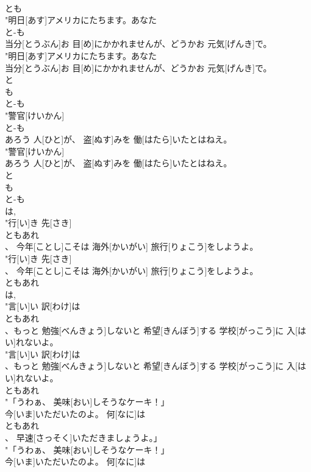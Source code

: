 \documentclass[8pt]{extreport}
\begin{document}
\begin{CJK}{UTF8}{min}
\\	とも
\\	"明日[あす]アメリカにたちます。あなた
\\	と-も
\\	当分[とうぶん]お 目[め]にかかれませんが、どうかお 元気[げんき]で。
\\	"明日[あす]アメリカにたちます。あなた
\\	当分[とうぶん]お 目[め]にかかれませんが、どうかお 元気[げんき]で。
\\	と 
\\	も	
\\	と-も
\\	"警官[けいかん]
\\	と-も
\\	あろう 人[ひと]が、 盗[ぬす]みを 働[はたら]いたとはねえ。
\\	"警官[けいかん]
\\	あろう 人[ひと]が、 盗[ぬす]みを 働[はたら]いたとはねえ。
\\	と 
\\	も	
\\	と-も
\\	は, 
\\	"行[い]き 先[さき]
\\	ともあれ
\\	、 今年[ことし]こそは 海外[かいがい] 旅行[りょこう]をしようよ。
\\	"行[い]き 先[さき]
\\	、 今年[ことし]こそは 海外[かいがい] 旅行[りょこう]をしようよ。
\\	ともあれ
\\	は, 
\\	"言[い]い 訳[わけ]は
\\	ともあれ
\\	、もっと 勉強[べんきょう]しないと 希望[きんぼう]する 学校[がっこう]に 入[はい]れないよ。
\\	"言[い]い 訳[わけ]は
\\	、もっと 勉強[べんきょう]しないと 希望[きんぼう]する 学校[がっこう]に 入[はい]れないよ。
\\	ともあれ
\\	"「うわぁ、 美味[おい]しそうなケーキ！」
\\	今[いま]いただいたのよ。 何[なに]は
\\	ともあれ
\\	、 早速[さっそく]いただきましょうよ。」
\\	"「うわぁ、 美味[おい]しそうなケーキ！」
\\	今[いま]いただいたのよ。 何[なに]は

\end{CJK}
\end{document}
